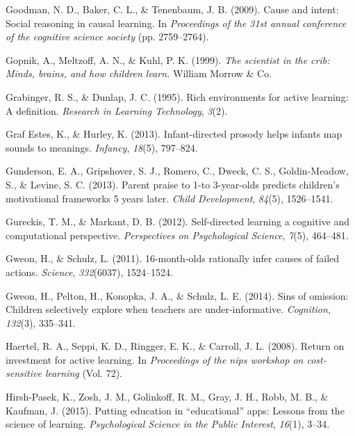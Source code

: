 \documentclass[english,floatsintext,man]{apa6}
\theoremstyle{definition}
\theoremstyle{definition}
\theoremstyle{definition}
\theoremstyle{remark}
\begin{document}
\hypertarget{ref-goodman2009cause}{}
Goodman, N. D., Baker, C. L., \& Tenenbaum, J. B. (2009). Cause and
intent: Social reasoning in causal learning. In \emph{Proceedings of the
31st annual conference of the cognitive science society} (pp.
2759--2764).

\hypertarget{ref-gopnik1999scientist}{}
Gopnik, A., Meltzoff, A. N., \& Kuhl, P. K. (1999). \emph{The scientist
in the crib: Minds, brains, and how children learn.} William Morrow \&
Co.

\hypertarget{ref-grabinger1995rich}{}
Grabinger, R. S., \& Dunlap, J. C. (1995). Rich environments for active
learning: A definition. \emph{Research in Learning Technology},
\emph{3}(2).

\hypertarget{ref-graf2013infant}{}
Graf Estes, K., \& Hurley, K. (2013). Infant-directed prosody helps
infants map sounds to meanings. \emph{Infancy}, \emph{18}(5), 797--824.

\hypertarget{ref-gunderson2013parent}{}
Gunderson, E. A., Gripshover, S. J., Romero, C., Dweck, C. S.,
Goldin-Meadow, S., \& Levine, S. C. (2013). Parent praise to 1-to
3-year-olds predicts children's motivational frameworks 5 years later.
\emph{Child Development}, \emph{84}(5), 1526--1541.

\hypertarget{ref-gureckis2012self}{}
Gureckis, T. M., \& Markant, D. B. (2012). Self-directed learning a
cognitive and computational perspective. \emph{Perspectives on
Psychological Science}, \emph{7}(5), 464--481.

\hypertarget{ref-gweon201116}{}
Gweon, H., \& Schulz, L. (2011). 16-month-olds rationally infer causes
of failed actions. \emph{Science}, \emph{332}(6037), 1524--1524.

\hypertarget{ref-gweon2014sins}{}
Gweon, H., Pelton, H., Konopka, J. A., \& Schulz, L. E. (2014). Sins of
omission: Children selectively explore when teachers are
under-informative. \emph{Cognition}, \emph{132}(3), 335--341.

\hypertarget{ref-haertel2008return}{}
Haertel, R. A., Seppi, K. D., Ringger, E. K., \& Carroll, J. L. (2008).
Return on investment for active learning. In \emph{Proceedings of the
nips workshop on cost-sensitive learning} (Vol. 72).

\hypertarget{ref-hirsh2015putting}{}
Hirsh-Pasek, K., Zosh, J. M., Golinkoff, R. M., Gray, J. H., Robb, M.
B., \& Kaufman, J. (2015). Putting education in ``educational'' apps:
Lessons from the science of learning. \emph{Psychological Science in the
Public Interest}, \emph{16}(1), 3--34.
\end{document}
